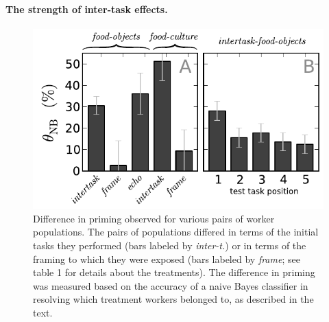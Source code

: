 \documentclass[12pt]{article}
\begin{document}
\paragraph{The strength of inter-task effects.}
\begin{figure}
	\centering
	\includegraphics[scale=1]{figs/theta.pdf}
	\caption{
		Difference in priming observed for various pairs of worker populations.
		The pairs of populations differed in terms of the initial tasks they
		performed (bars labeled by \textit{inter-t.}) or in terms of the framing
		to which they were exposed (bars labeled by \textit{frame}; see table 1 for
		details about the treatments).  The difference in priming was 
		measured based on the accuracy of a naive Bayes classifier in 
		resolving which treatment workers belonged to, as described in the 
		text.  
	}
	\label{fig:theta}
\end{figure}


\end{document}
